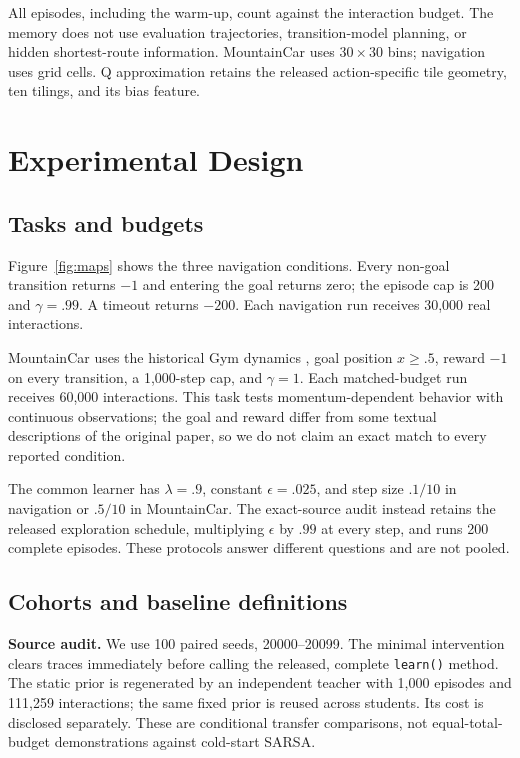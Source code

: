 \documentclass[10pt,twocolumn,letterpaper]{article}
\begin{document}
All episodes, including the warm-up, count against the interaction budget. The memory does not use evaluation trajectories, transition-model planning, or hidden shortest-route information. MountainCar uses $30\times30$ bins; navigation uses grid cells. Q approximation retains the released action-specific tile geometry, ten tilings, and its bias feature.

\section{Experimental Design}
\subsection{Tasks and budgets}
Figure~\ref{fig:maps} shows the three navigation conditions. Every non-goal transition returns $-1$ and entering the goal returns zero; the episode cap is 200 and $\gamma=.99$. A timeout returns $-200$. Each navigation run receives 30,000 real interactions.

MountainCar uses the historical Gym dynamics \citep{gymcode}, goal position $x\geq .5$, reward $-1$ on every transition, a 1,000-step cap, and $\gamma=1$. Each matched-budget run receives 60,000 interactions. This task tests momentum-dependent behavior with continuous observations; the goal and reward differ from some textual descriptions of the original paper, so we do not claim an exact match to every reported condition.

The common learner has $\lambda=.9$, constant $\epsilon=.025$, and step size $.1/10$ in navigation or $.5/10$ in MountainCar. The exact-source audit instead retains the released exploration schedule, multiplying $\epsilon$ by $.99$ at every step, and runs 200 complete episodes. These protocols answer different questions and are not pooled.

\subsection{Cohorts and baseline definitions}
\textbf{Source audit.} We use 100 paired seeds, 20000--20099. The minimal intervention clears traces immediately before calling the released, complete \texttt{learn()} method. The static prior is regenerated by an independent teacher with 1,000 episodes and 111,259 interactions; the same fixed prior is reused across students. Its cost is disclosed separately. These are conditional transfer comparisons, not equal-total-budget demonstrations against cold-start SARSA.
\end{document}
